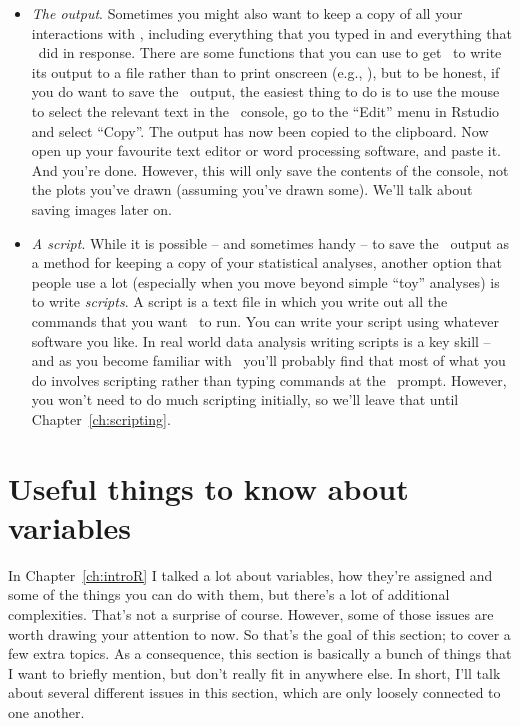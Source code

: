 \begin{itemize}

\item {\it The output}. Sometimes you might also want to keep a copy of all your interactions with \R, including everything that you typed in and everything that \R\ did in response. There are some functions that you can use to get \R\ to write its output to a file rather than to print onscreen (e.g., ), but to be honest, if you do want to save the \R\ output, the easiest thing to do is to use the mouse to select the relevant text in the \R\ console, go to the ``Edit'' menu in Rstudio and select ``Copy''. The output has now been copied to the clipboard. Now open up your favourite text editor or word processing software, and paste it. And you're done.  However, this will only save the contents of the console, not the plots you've drawn (assuming you've drawn some). We'll talk about saving images later on.


\item {\it A script}. While it is possible -- and sometimes handy -- to save the \R\ output as a method for keeping a copy of your statistical analyses, another option that people use a lot (especially when you move beyond simple ``toy'' analyses) is to write {\it scripts}. A script is a text file in which you write out all the commands that you want \R\ to run. You can write your script using whatever software you like. In real world data analysis writing scripts is a key skill -- and as you become familiar with \R\ you'll probably find that most of what you do involves scripting rather than typing commands at the \R\ prompt. However, you won't need to do much scripting initially, so we'll leave that until Chapter~\ref{ch:scripting}.

\end{itemize}




\section{Useful things to know about variables~\label{sec:useful}}

In Chapter~\ref{ch:introR} I talked a lot about variables, how they're assigned and some of the things you can do with them, but there's a lot of additional complexities. That's not a surprise of course. However, some of those issues are worth drawing your attention to now. So that's the goal of this section; to cover a few extra topics. As a consequence, this section is basically a bunch of things that I want to briefly mention, but don't really fit in anywhere else. In short, I'll talk about several different issues in this section, which are only loosely connected to one another.



